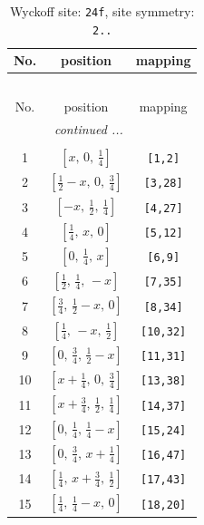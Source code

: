 \documentclass[fleqn,8pt]{jsarticle}
\begin{document}
\renewcommand{\arraystretch}{1.2}
\begin{longtable}{ccc}
\caption{Wyckoff site: {\tt 24f}, site symmetry: {\tt 2..}}
 \\
 \hline \hline
No. & position & mapping \\ \hline \endfirsthead

\multicolumn{2}{l}{\tablename\ \thetable{}} \\
 \hline \hline
No. & position & mapping \\ \hline \endhead

 \hline \hline
\multicolumn{2}{r}{\footnotesize\it continued ...} \\ \endfoot

 \hline \hline
\multicolumn{2}{r}{} \\ \endlastfoot

1 & $\left[ x,\, 0,\, \frac{1}{4} \right]$ & {\tt [1,2]} \\ \hline
2 & $\left[ \frac{1}{2} - x,\, 0,\, \frac{3}{4} \right]$ & {\tt [3,28]} \\ \hline
3 & $\left[ - x,\, \frac{1}{2},\, \frac{1}{4} \right]$ & {\tt [4,27]} \\ \hline
4 & $\left[ \frac{1}{4},\, x,\, 0 \right]$ & {\tt [5,12]} \\ \hline
5 & $\left[ 0,\, \frac{1}{4},\, x \right]$ & {\tt [6,9]} \\ \hline
6 & $\left[ \frac{1}{2},\, \frac{1}{4},\, - x \right]$ & {\tt [7,35]} \\ \hline
7 & $\left[ \frac{3}{4},\, \frac{1}{2} - x,\, 0 \right]$ & {\tt [8,34]} \\ \hline
8 & $\left[ \frac{1}{4},\, - x,\, \frac{1}{2} \right]$ & {\tt [10,32]} \\ \hline
9 & $\left[ 0,\, \frac{3}{4},\, \frac{1}{2} - x \right]$ & {\tt [11,31]} \\ \hline
10 & $\left[ x + \frac{1}{4},\, 0,\, \frac{3}{4} \right]$ & {\tt [13,38]} \\ \hline
11 & $\left[ x + \frac{3}{4},\, \frac{1}{2},\, \frac{1}{4} \right]$ & {\tt [14,37]} \\ \hline
12 & $\left[ 0,\, \frac{1}{4},\, \frac{1}{4} - x \right]$ & {\tt [15,24]} \\ \hline
13 & $\left[ 0,\, \frac{3}{4},\, x + \frac{1}{4} \right]$ & {\tt [16,47]} \\ \hline
14 & $\left[ \frac{1}{4},\, x + \frac{3}{4},\, \frac{1}{2} \right]$ & {\tt [17,43]} \\ \hline
15 & $\left[ \frac{1}{4},\, \frac{1}{4} - x,\, 0 \right]$ & {\tt [18,20]} \\ \hline

\end{longtable}
\end{document}
